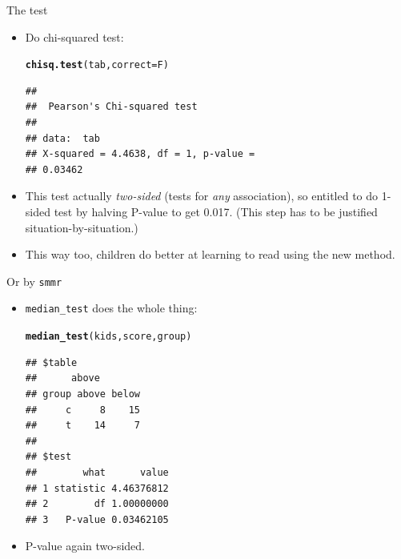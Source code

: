 \documentclass[unknownkeysallowed]{beamer}\usepackage[]{graphicx}\usepackage[]{color}
\makeatletter
\newcommand{\hlstd}[1]{\textcolor[rgb]{0.345,0.345,0.345}{#1}}%
\newcommand{\hlkwc}[1]{\textcolor[rgb]{0.333,0.667,0.333}{#1}}%
\newcommand{\hlkwd}[1]{\textcolor[rgb]{0.737,0.353,0.396}{\textbf{#1}}}%
\newenvironment{kframe}{%
 \def\at@end@of@kframe{}%
 \ifinner\ifhmode%
  \def\at@end@of@kframe{\end{minipage}}%
  \begin{minipage}{\columnwidth}%
 \fi\fi%
 \def\FrameCommand##1{\hskip\@totalleftmargin \hskip-\fboxsep
 \colorbox{shadecolor}{##1}\hskip-\fboxsep
     \hskip-\linewidth \hskip-\@totalleftmargin \hskip\columnwidth}%
 \MakeFramed {\advance\hsize-\width
   \@totalleftmargin\z@ \linewidth\hsize
   \@setminipage}}%
 {\par\unskip\endMakeFramed%
 \at@end@of@kframe}
\newenvironment{knitrout}{}{} %
\makeatother
\begin{document}
\begin{frame}[fragile]{The test}
  \begin{itemize}
\item Do chi-squared test:
  
\begin{knitrout}
\color{fgcolor}\begin{kframe}
\begin{alltt}
\hlkwd{chisq.test}\hlstd{(tab,}\hlkwc{correct}\hlstd{=F)}
\end{alltt}
\begin{verbatim}
## 
## 	Pearson's Chi-squared test
## 
## data:  tab
## X-squared = 4.4638, df = 1, p-value =
## 0.03462
\end{verbatim}
\end{kframe}
\end{knitrout}
\item This test actually \emph{two-sided} (tests for \emph{any}
  association), so entitled to do 1-sided test by halving P-value to
  get 0.017. (This step has to be justified situation-by-situation.)
\item This way too, children do better at learning to read using the
  new method.
  \end{itemize}
\end{frame}

\begin{frame}[fragile]{Or by \texttt{smmr}}
  
  \begin{itemize}
  \item \texttt{median\_test} does the whole thing:
    
\begin{knitrout}
\color{fgcolor}\begin{kframe}
\begin{alltt}
\hlkwd{median_test}\hlstd{(kids,score,group)}
\end{alltt}
\begin{verbatim}
## $table
##      above
## group above below
##     c     8    15
##     t    14     7
## 
## $test
##        what      value
## 1 statistic 4.46376812
## 2        df 1.00000000
## 3   P-value 0.03462105
\end{verbatim}
\end{kframe}
\end{knitrout}
\item P-value again two-sided.
  \end{itemize}
  
\end{frame}
\end{document}
